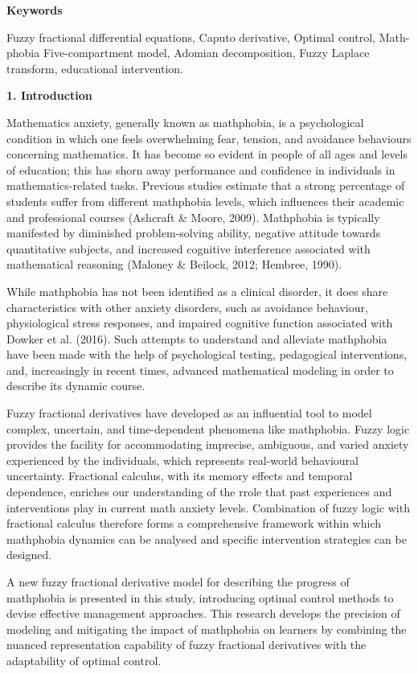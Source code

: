 \textbf{Keywords}

Fuzzy fractional differential equations, Caputo derivative, Optimal control, Math-phobia Five-compartment model, Adomian decomposition, Fuzzy Laplace transform, educational intervention.

\textbf{1. Introduction}

Mathematics anxiety, generally known as mathphobia, is a psychological condition in which one feels overwhelming fear, tension, and avoidance behaviours concerning mathematics. It has become so evident in people of all ages and levels of education; this has shorn away performance and confidence in individuals in mathematics-related tasks. Previous studies estimate that a strong percentage of students suffer from different mathphobia levels, which influences their academic and professional courses (Ashcraft \& Moore, 2009). Mathphobia is typically manifested by diminished problem-solving ability, negative attitude towards quantitative subjects, and increased cognitive interference associated with mathematical reasoning (Maloney \& Beilock, 2012; Hembree, 1990).

While mathphobia has not been identified as a clinical disorder, it does share characteristics with other anxiety disorders, such as avoidance behaviour, physiological stress responses, and impaired cognitive function associated with Dowker et al. (2016). Such attempts to understand and alleviate mathphobia have been made with the help of psychological testing, pedagogical interventions, and, increasingly in recent times, advanced mathematical modeling in order to describe its dynamic course.

Fuzzy fractional derivatives have developed as an influential tool to model complex, uncertain, and time-dependent phenomena like mathphobia. Fuzzy logic provides the facility for accommodating imprecise, ambiguous, and varied anxiety experienced by the individuals, which represents real-world behavioural uncertainty. Fractional calculus, with its memory effects and temporal dependence, enriches our understanding of the rrole that past experiences and interventions play in current math anxiety levels. Combination of fuzzy logic with fractional calculus therefore forms a comprehensive framework within which mathphobia dynamics can be analysed and specific intervention strategies can be designed.

A new fuzzy fractional derivative model for describing the progress of mathphobia is presented in this study, introducing optimal control methods to devise effective management approaches. This research develops the precision of modeling and mitigating the impact of mathphobia on learners by combining the nuanced representation capability of fuzzy fractional derivatives with the adaptability of optimal control.

